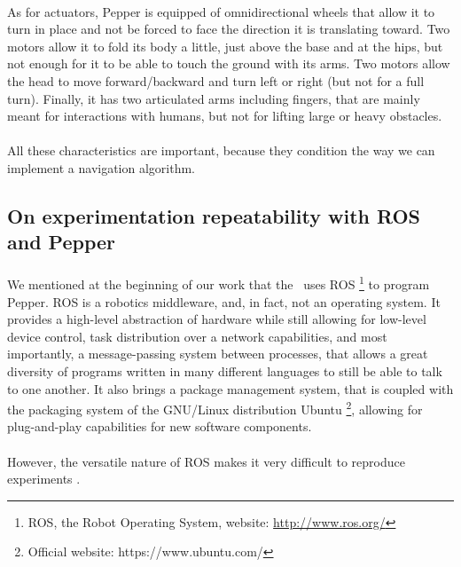 \paragraph{} As for actuators, Pepper is equipped of omnidirectional wheels that allow it to turn in place and not be forced to face the direction it is translating toward. Two motors allow it to fold its body a little, just above the base and at the hips, but not enough for it to be able to touch the ground with its arms. Two motors allow the head to move forward/backward and turn left or right (but not for a full turn). Finally, it has two articulated arms including fingers, that are mainly meant for interactions with humans, but not for lifting large or heavy obstacles.

\paragraph{} All these characteristics are important, because they condition the way we can implement a navigation algorithm.

\subsection{On experimentation repeatability with ROS and Pepper}

\paragraph{} We mentioned at the beginning of our work that the \groupname \, uses ROS \footnote{ROS, the Robot Operating System, website: \url{http://www.ros.org/}} to program Pepper. ROS is a robotics middleware, and, in fact, not an operating system. It provides a high-level abstraction of hardware while still allowing for low-level device control, task distribution over a network capabilities, and most importantly, a message-passing system between processes, that allows a great diversity of programs written in many different languages to still be able to talk to one another. It also brings a package management system, that is coupled with the packaging system of the GNU/Linux distribution Ubuntu \footnote{Official website: https://www.ubuntu.com/}, allowing for plug-and-play capabilities for new software components.

\paragraph{} However, the versatile nature of ROS makes it very difficult to reproduce experiments \parencite{white_ros_2017}.

